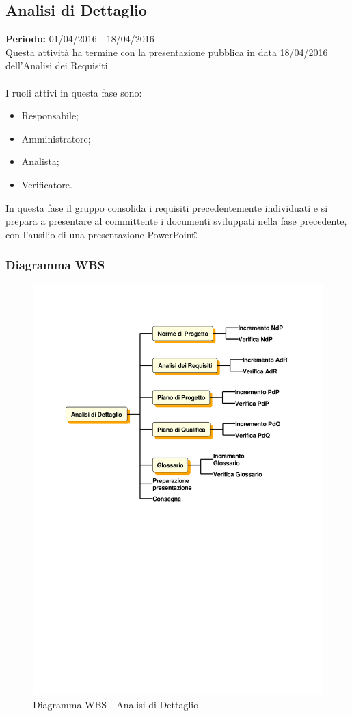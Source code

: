 \subsection{Analisi di Dettaglio}
\textbf{Periodo:} 01/04/2016 - 18/04/2016\\
Questa attività ha termine con la presentazione pubblica in data 18/04/2016 
dell'Analisi dei Requisiti\\\\
I ruoli attivi in questa fase sono:

\begin{itemize}
	\item Responsabile;
	\item Amministratore;
	\item Analista;
	\item Verificatore.
\end{itemize}
In questa fase il gruppo consolida i requisiti precedentemente individuati e si 
prepara a presentare al committente i documenti sviluppati nella fase 
precedente, con l'ausilio di una presentazione PowerPoint\G.

\subsubsection{Diagramma WBS}
\begin{figure}[H]
	\centering
	\includegraphics[width= 15cm]{immagini/ad_wbs.pdf}
	\caption{Diagramma WBS - Analisi di Dettaglio}
\end{figure}

